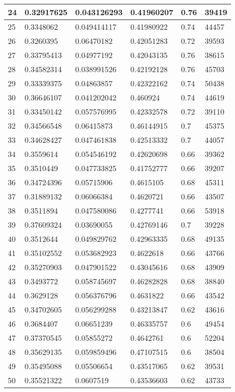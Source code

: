 \begin{longtable}{|l|l|l|l|l|l|}
24 & 0.32917625 & 0.043126293 & 0.41960207 & 0.76 & 39419 \\ \hline 
25 & 0.3348062 & 0.049414117 & 0.41980922 & 0.74 & 44457 \\ \hline 
26 & 0.3260395 & 0.06470182 & 0.42051283 & 0.72 & 39593 \\ \hline 
27 & 0.33795413 & 0.04977192 & 0.42043135 & 0.76 & 38615 \\ \hline 
28 & 0.34582314 & 0.038991526 & 0.42192128 & 0.76 & 45703 \\ \hline 
29 & 0.33339375 & 0.04863857 & 0.42322162 & 0.74 & 50438 \\ \hline 
30 & 0.36646107 & 0.041202042 & 0.460924 & 0.74 & 44619 \\ \hline 
31 & 0.33450142 & 0.057576995 & 0.42332578 & 0.72 & 39110 \\ \hline 
32 & 0.34566548 & 0.06415873 & 0.46144915 & 0.7 & 45375 \\ \hline 
33 & 0.34628427 & 0.047461838 & 0.42513332 & 0.7 & 44057 \\ \hline 
34 & 0.3559614 & 0.054546192 & 0.42620698 & 0.66 & 39362 \\ \hline 
35 & 0.3510449 & 0.047733825 & 0.41752777 & 0.66 & 39207 \\ \hline 
36 & 0.34724396 & 0.05715906 & 0.4615105 & 0.68 & 45311 \\ \hline 
37 & 0.31889132 & 0.06066384 & 0.4620721 & 0.66 & 43507 \\ \hline 
38 & 0.3511894 & 0.047580086 & 0.4277741 & 0.66 & 53918 \\ \hline 
39 & 0.37609324 & 0.03690055 & 0.42769146 & 0.7 & 39228 \\ \hline 
40 & 0.3512644 & 0.049829762 & 0.42963335 & 0.68 & 49135 \\ \hline 
41 & 0.35102552 & 0.053682923 & 0.4622618 & 0.66 & 43766 \\ \hline 
42 & 0.35270903 & 0.047901522 & 0.43045616 & 0.68 & 43909 \\ \hline 
43 & 0.3493772 & 0.058745697 & 0.46282828 & 0.68 & 38840 \\ \hline 
44 & 0.3629128 & 0.056376796 & 0.4631822 & 0.66 & 43542 \\ \hline 
45 & 0.34702605 & 0.056299288 & 0.43213847 & 0.62 & 43616 \\ \hline 
46 & 0.3684407 & 0.06651239 & 0.46335757 & 0.6 & 49454 \\ \hline 
47 & 0.37370545 & 0.05855272 & 0.4642761 & 0.6 & 52204 \\ \hline 
48 & 0.35629135 & 0.059859496 & 0.47107515 & 0.6 & 38504 \\ \hline 
49 & 0.35495088 & 0.05506654 & 0.43517065 & 0.62 & 39531 \\ \hline 
50 & 0.35521322 & 0.0607519 & 0.43536603 & 0.62 & 43733 \\ \hline 
\end{longtable}